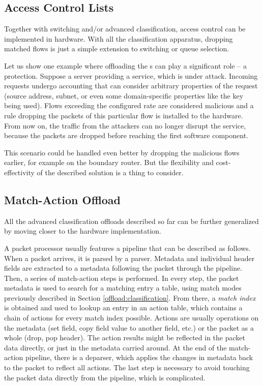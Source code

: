 \subsection{Access Control Lists}

Together with switching and/or advanced classification, access control can
be implemented in hardware. With all the classification apparatus, dropping
matched flows is just a simple extension to switching or queue selection.

Let us show one example where offloading the s can play a significant
role -- a  protection. Suppose a server providing a service, which is
under  attack. Incoming requests undergo accounting that can consider
arbitrary properties of the request (source address, subnet, or even
some domain-specific properties like the  key being used). Flows
exceeding the configured rate are considered malicious and a rule dropping the
packets of this particular flow is installed to the hardware. From now on, the traffic from the
attackers can no longer disrupt the service, because the packets are dropped
before reaching the first software component.

This scenario could be handled even better by dropping the malicious flows earlier, for
example on the boundary router. But the flexibility and cost-effectivity of the
described solution is a thing to consider.

\subsection{Match-Action Offload}
\label{offload:match-action}

All the advanced classification offloads described so far can be further
generalized by moving closer to the hardware implementation.

A packet processor usually features a pipeline that can be described as
follows. When a packet arrives, it is parsed by a parser. Metadata and
individual header fields are extracted to a metadata following the packet
through the pipeline. Then, a series of match-action steps is performed. In
every step, the packet metadata is used to search for a matching entry a table,
using match modes previously described in Section \ref{offload:classification}.
From there, a \emph{match index} is obtained and used to lookup an entry in an
action table, which
contains a chain of actions for every match index possible. Actions are usually
operations on the metadata (set field, copy field value to another field, etc.)
or the packet as a whole (drop, pop header). The action results might be
reflected in the packet data directly, or just in the metadata carried around.
At the end of the match-action pipeline, there is a deparser, which applies
the changes in metadata back to the packet to reflect all actions. The last step is
necessary to avoid touching the packet data directly from the pipeline, which
is complicated.

